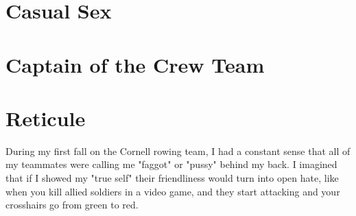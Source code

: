 \documentclass[12pt]{article}
\begin{document}
\section{Casual Sex}

\section{Captain of the Crew Team}

\section{Reticule}
During my first fall on the Cornell rowing team, I had a constant sense that all
of my teammates were calling me "faggot" or "pussy" behind my back.  I imagined
that if I showed my "true self" their friendliness would turn into open hate,
like when you kill allied soldiers in a video game, and they start attacking and
your crosshairs go from green to red.  
\end{document}
